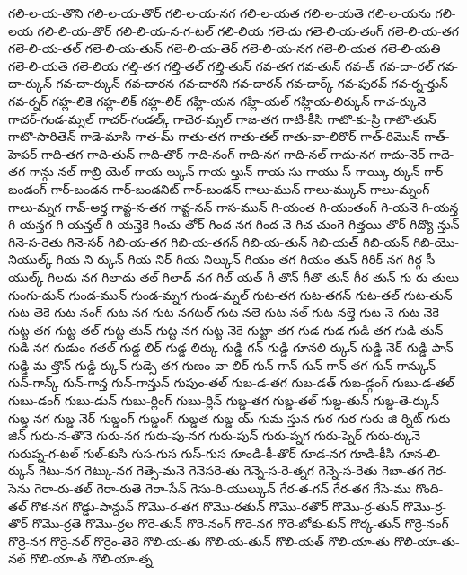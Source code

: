 {గలి-ల-య-తొని
గలి-ల-య-తొర్
గలి-ల-య-నగ
గలి-ల-యత
గలి-ల-యతె
గలి-ల-యను
గలి-లయ
గలి-లి-య-తొర్
గలి-లి-య-న-గ-టల్
గలి-లియ
గలె-దు
గలె-లి-య-తంగ్
గలె-లి-య-తగ
గలె-లి-య-తల్
గలె-లి-య-తున్
గలె-లి-య-తెర్
గలె-లి-య-నగ
గలె-లి-యత
గలె-లి-యతి
గలె-లి-యతె
గలె-లియ
గల్తి-తగ
గల్తి-తల్
గల్తి-తున్
గవ-తగ
గవ-తున్
గవ-త్
గవ-దా-రల్
గవ-దా-ర్కున్
గవ-దా-ర్కున్
గవ-దారన
గవ-దారని
గవ-దారన్
గవ-దార్క్
గవ-పురవ్
గవ-ర్న-ర్తున్
గవ-ర్నర్
గహ్ల-లికె
గహ్ల-లిక్
గహ్ల-లిర్
గహ్లి-యన
గహ్లి-యల్
గహ్లియ-లిర్కున్
గాచ-ర్కునె
గాచర్-గండ-మ్నల్
గాచర్-గండల్క్
గాచెర-మ్నల్
గాజ-తగ
గాటి-కీసి
గాటొ-కు-స్రి
గాటొ-తున్
గాటొ-సారితెన్
గాడె-మాసి
గాత-మ్
గాతు-తగ
గాతు-తల్
గాతు-వా-లిరొర్
గాత్-రిమొన్
గాత్-హెపర్
గాది-తగ
గాది-తున్
గాది-తొర్
గాది-నంగ్
గాది-నగ
గాది-నల్
గాదు-నగ
గాదు-నెర్
గాదె-తగ
గాన్గు-నల్
గాబ్రి-యెల్
గాయ-ల్కున్
గాయ-ల్తున్
గాయ-సు
గాయు-స్
గాయ్కి-ర్కున్
గార్-బండంగ్
గార్-బండన
గార్-బండనిట్
గార్-బండన్
గాలు-మున్
గాలు-మ్కున్
గాలు-మ్నంగ్
గాలు-మ్నగ
గావ్-అర్త
గావ్ట-న-తగ
గావ్ట-నన్
గాస-మున్
గి-యంత
గి-యంతంగ్
గి-యనె
గి-యన్త
గి-యన్తగ
గి-యన్తల్
గి-యన్తెకె
గించు-తోర్
గింద-నగ
గింద-నె
గిచ-చుంగె
గిత్తయి-తొర్
గిద్యొ-న్తున్
గినె-స-రెతు
గినె-సర్
గిబి-య-తగ
గిబి-య-తగన్
గిబి-య-తున్
గిబి-యత్
గిబి-యన్
గిబి-యొ-నియుల్క్
గియ-ని-ర్కున్
గియ-నిర్
గియ-నిల్కున్
గియం-తగ
గియం-తున్
గిరిక్-నగ
గిర్గ-సీ-యుల్క్
గిలదు-నగ
గిలాదు-తల్
గిలాద్-నగ
గిల్-యత్
గీ-తొన్
గీతొ-తున్
గీర-తున్
గు-రు-తులు
గుంగు-డున్
గుండ-మున్
గుండ-మ్నగ
గుండ-మ్నల్
గుట-తగ
గుట-తగన్
గుట-తల్
గుట-తున్
గుట-తెకె
గుట-నంగ్
గుట-నగ
గుట-నగటల్
గుట-నలె
గుట-నల్
గుట-నల్తె
గుట-నె
గుట-నెకె
గుట్ట-తగ
గుట్ట-తల్
గుట్ట-తున్
గుట్ట-నగ
గుట్ట-నెకె
గుట్టా-తగ
గుడ-గుడ
గుడి-తగ
గుడి-తున్
గుడి-నగ
గుడుం-గతల్
గుడ్డ-లిర్
గుడ్డ-లిర్కు
గుడ్డి-గన్
గుడ్డి-గూనలి-ర్కున్
గుడ్డి-నెర్
గుడ్డి-పాన్
గుడ్డి-మ-త్తొన్
గుడ్డి-ర్కున్
గుడ్సె-తగ
గుణం-వా-లిర్
గున్-గాన్
గున్-గాన్-తగ
గున్-గాన్కున్
గున్-గాన్క్
గున్-గాన్త
గున్-గాన్తున్
గుపుం-తల్
గుబ-డ-తగ
గుబ-డత్
గుబ-డ్గంగ్
గుబు-డ-తల్
గుబు-డంగ్
గుబు-డున్
గుబు-ర్లింగ్
గుబు-ర్లిన్
గుబ్డ-తగ
గుబ్డ-తల్
గుబ్డ-తున్
గుబ్డ-తె-ర్కున్
గుబ్డ-నగ
గుబ్డ-నెర్
గుబ్డంగ్-గుబ్డంగ్
గుబ్డత-గుబ్డ-య్
గుమ-స్తున
గుర-గుర
గురు-జి-ర్నిట్
గురు-జిన్
గురు-న-తొనె
గురు-నగ
గురు-పు-నగ
గురు-పున్
గురు-ప్నగ
గురు-ప్నెర్
గురు-ర్కునె
గురుప్న-గ-టల్
గుల్-కుసి
గుస-గుస
గుస్-గుస
గూండి-కీ-తొర్
గూడ-నగ
గూడి-కీసి
గూన-లి-ర్కున్
గెటు-నగ
గెట్కు-నగ
గెత్సె-మనె
గెనెసరె-తు
గెన్నె-స-రె-త్నగ
గెన్నె-స-రెతు
గెబా-తగ
గెర-సెను
గెరా-రు-తల్
గెరా-రుతె
గెరా-సేన్
గెసు-రి-యుల్కున్
గేర-త-గన్
గేర-తగ
గేసె-ము
గొంది-తల్
గొక-నగ
గొడ్డు-పాన్దున్
గొమొ-ర-తగ
గొమొ-రతున్
గొమొ-రతొర్
గొమొ-ర్ర-తున్
గొమొ-ర్ర-తొర్
గొమొ-ర్రతె
గొమొ-ర్రల
గొరె-తున్
గొరె-నంగ్
గొరె-నగ
గొరె-బోకు-కున్
గొర్క-తున్
గొర్రె-నంగ్
గొర్రె-నగ
గొర్రె-నల్
గొర్రెం-తెరె
గొలి-య-తు
గొలి-య-తున్
గొలి-యత్
గొలి-యా-తు
గొలి-యా-తు-నల్
గొలి-యా-త్
గొలి-యా-త్న
}
